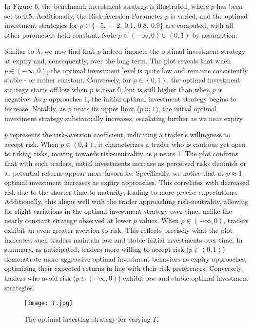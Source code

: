 \documentclass[11pt]{article}
\numberwithin{equation}{section}
\begin{document}
In Figure 6, the benchmark investment strategy is illustrated, where $p$ has
been set to $0.5$. Additionally, the Risk-Aversion Parameter $p$ is varied, and the
optimal investment strategies for $p \in \{-5,\:-2,\:0.1,\: 0.8, \:0.9\}$ are computed,
with all other parameters held constant. Note $p \in (−\infty, 0) \cup (0, 1)$ by assumption.

Similar to $\bar{\lambda}$, we now find that $p$ indeed
impacts the optimal investment strategy at expiry and, consequently, over the
long term. The plot reveals that when $p \in (-\infty, 0)$, the optimal
investment level is quite low and remains consistently stable - or rather constant. Conversely, for
$p \in (0, 1)$, the optimal investment strategy starts off low when $p$ is near
0, but is still higher than when $p$ is negative. As $p$ approaches 1, the
initial optimal investment strategy begins to increase. Notably, as $p$ nears
its upper limit ($p \approx 1$), the initial optimal investment strategy
substantially increases, escalating further as we near expiry.

$p$ represents the risk-aversion coefficient, indicating a trader's willingness to accept risk. When $p \in (0, 1)$, it characterizes a trader who is cautious yet open to taking risks, moving towards risk-neutrality as $p$ nears 1. The plot confirms that with such traders, initial investments increase as perceived risks diminish or as potential returns appear more favorable. Specifically, we notice that at $p \approx 1$, optimal investment increases as expiry approaches. This correlates with decreased risk due to the shorter time to maturity, leading to more precise expectations. Additionally, this aligns well with the trader approaching risk-neutrality, allowing for slight variations in the optimal investment strategy over time, unlike the nearly constant strategy observed at lower $p$ values. When $p \in (-\infty, 0)$, traders exhibit an even greater aversion to risk. This reflects precisely what the plot indicates: such traders maintain low and stable initial investments over time. In summary, as anticipated, traders more willing to accept risk ($p \in (0, 1)$) demonstrate more aggressive optimal investment behaviors as expiry approaches, optimizing their expected returns in line with their risk preferences. Conversely, traders who avoid risk ($p \in (-\infty, 0)$) exhibit low and stable optimal investment strategies.

\newpage
\begin{figure}[!h]
    \centering
    \hspace*{-2cm}
    \texttt{[image: T.jpg]}
    \label{Figure 7}
    \setlength{\abovecaptionskip}{-5pt}
    \caption{The optimal investing strategy for varying $T$.}
\end{figure}
\end{document}
